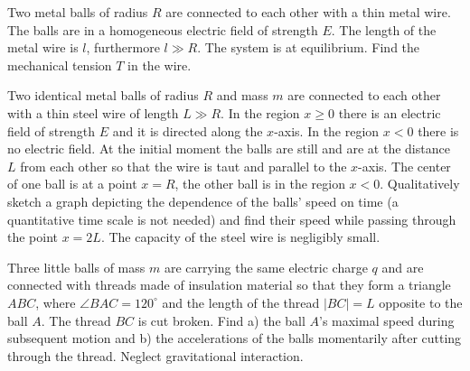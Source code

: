 \documentclass[11pt]{article}
\begin{document}

\probeng
Two metal balls of radius $R$ are connected to each other with a thin metal wire. The balls are in a homogeneous electric field of strength $E$. The length of the metal wire is $l$, furthermore $l\gg R$. The system is at equilibrium. Find the mechanical tension $T$ in the wire.
\probend
\bigskip


\probeng
Two identical metal balls of radius $R$ and mass $m$ are connected to each other with a thin steel wire of length $L\gg R$. In the region $x\ge 0$ there is an electric field of strength $E$ and it is directed along the $x$-axis. In the region $x< 0$ there is no electric field. At the initial moment the balls are still and are at the distance $L$ from each other so that the wire is taut and parallel to the $x$-axis. The center of one ball is at a point $x=R$, the other ball is in the region $x<0$. Qualitatively sketch a graph depicting the dependence of the balls’ speed on time (a quantitative time scale is not needed) and find their speed while passing through the point $x=2L$. The capacity of the steel wire is negligibly small.
\probend
\bigskip


\probeng
Three little balls of mass $m$ are carrying the same electric charge $q$ and are connected with threads made of insulation material so that they form a triangle $ABC$, where $\angle BAC=120^\circ$ and the length of the thread $|BC|=L$ opposite to the ball $A$. The thread $BC$ is cut broken. Find a) the ball $A$’s maximal speed during subsequent motion and b) the accelerations of the balls momentarily after cutting through the thread. Neglect gravitational interaction.
\probend
\bigskip
\newpage\subsection{\protect{}}

\end{document}

